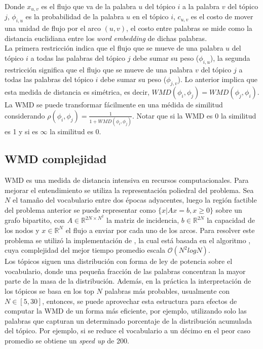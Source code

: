 Donde $x_{u,v}$ es el flujo que va de la palabra $u$ del tópico $i$ a la palabra $v$ del tópico $j$, $\phi_{i,u}$ es la probabilidad de la palabra $u$ en el tópico $i$, $c_{u,v}$ es el costo de mover una unidad de flujo por el arco $(u,v)$, el costo entre palabras se mide como la distancia euclidiana entre los \textit{word embedding} de dichas palabras.\\

La primera restricción indica que el flujo que se mueve de una palabra $u$ del tópico $i$ a todas las palabras del tópico $j$ debe sumar su peso ($\phi_{i,u}$), la segunda restricción significa que el flujo que se mueve de una palabra $v$ del tópico $j$ a todas las palabras del tópico $i$ debe sumar su peso ($\phi_{j,v}$). Lo anterior implica que esta medida de distancia es simétrica, es decir, $WMD(\phi_{i}, \phi_{j}) = WMD(\phi_{j}, \phi_{i})$.\\

La WMD se puede transformar fácilmente en una médida de similitud considerando $\rho(\phi_{i}, \phi_{j}) = \frac{1}{1+WMD(\phi_{i}, \phi_{j})}$. Notar que si la WMD es 0 la similitud es 1 y si es $\infty$ la similitud es 0. \\

\subsection{WMD complejidad}

WMD es una medida de distancia intensiva en recursos computacionales. Para mejorar el entendimiento se utiliza la representación poliedral del problema. Sea $N$ el tamaño del vocabulario entre dos épocas adyacentes, luego la región factible del problema anterior se puede representar como $\{x| Ax=b, x\geq 0\}$ sobre un grafo bipartito, con $A\in \mathbb{R}^{2N\times N^{2}}$ la matriz de incidencia, $b\in \mathbb{R}^{2N}$ la capacidad de los nodos y $x\in \mathbb{R}^{N}$ el flujo a enviar por cada uno de los arcos. Para resolver este problema se utilizó la implementación de \citep{PyEMD}, la cual está basada en el algoritmo \citep{pele2009fast}, cuya complejidad del mejor tiempo promedio escala $\mathcal{O}(N^{2}log N)$.\\

Los tópicos siguen una distribución con forma de ley de potencia sobre el vocabulario, donde una pequeña fracción de las palabras concentran la mayor parte de la masa de la distribución. Además, en la práctica la interpretación de los tópicos se basa en los top $N$ palabras más probables, usualmente con $N \in [5, 30]$, entonces, se puede aprovechar esta estructura para efectos de computar la WMD de un forma más eficiente, por ejemplo, utilizando solo las palabras que capturan un determinado porcentaje de la distribución acumulada del tópico. Por ejemplo, si se reduce el vocabulario a un décimo en el peor caso promedio se obtiene un \textit{speed up} de 200.\\

